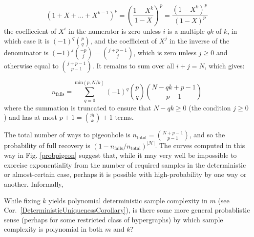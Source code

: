 \begin{equation*}
(1 + X + \ldots + X^{k-1})^p = \left(\frac{1 - X^k}{1 - X} \right)^p = \frac{\left(1 - X^k \right)^p}{\left(1 - X\right)^p}
\end{equation*}
the coeffiecient of $X^i$ in the numerator is zero unless $i$ is a multiple $qk$ of $k$, in which case it is $(-1)^q{p \choose q}$, and the coefficient of $X^j$ in the inverse of the denominator is $(-1)^j {-p \choose j} = {j + p-1 \choose j}$, which is zero unless $j \geq 0$ and otherwise equal to ${j + p-1 \choose p-1}$. It remains to sum over all $i + j = N$, which gives:

\begin{equation*}
n_\text{fails} = \sum_{q=0}^{\text{min}(p, N/k)} (-1)^q {p \choose q} {N - qk + p - 1 \choose p - 1}
\end{equation*}
where the summation is truncated to ensure that $N - qk \geq 0$ (the condition $j \geq 0$) and has at most $p+1 = {\overline m \choose k} + 1$ terms.

The total number of ways to pigeonhole is $n_\text{total} = {N +p- 1 \choose p - 1}$, and so the probability of full recovery is $\left(1 - n_\text{fails} / n_\text{total} \right)^{|\mathcal{H}|}$. 
The curves computed in this way in Fig. \ref{probpigeon} suggest that, while it may very well be impossible to exorcise exponentiality from the number of required samples in the deterministic or almost-certain case, perhaps it is possible with high-probability by one way or another. Informally,

\begin{question}
While fixing $k$ yields polynomial deterministic sample complexity in $m$ (see Cor.~\ref{DeterministicUniquenessCorollary}), is there some more general probablistic sense (perhaps for some restricted class of hypergraphs) by which sample complexity is polynomial in both $m$ and $k$?
\end{question}



